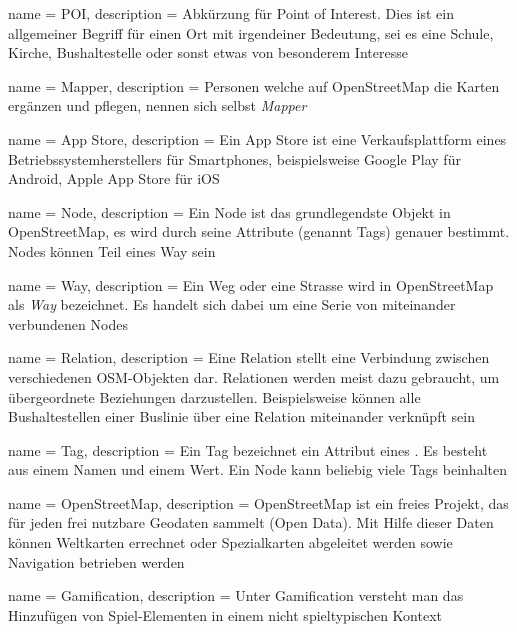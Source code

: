  {
	name = POI,
	description = {Abkürzung für Point of Interest. Dies ist ein allgemeiner Begriff für einen Ort mit irgendeiner Bedeutung, sei es eine Schule, Kirche, Bushaltestelle oder sonst etwas von besonderem Interesse\cite{ba-kort-2012}}
}

 {
	name = Mapper,
	description = {Personen welche auf OpenStreetMap die Karten ergänzen und pflegen, nennen sich selbst \emph{Mapper}\cite{ba-kort-2012}}
}

 {
	name = App Store,
	description = {Ein App Store ist eine Verkaufsplattform eines Betriebssystemherstellers für Smartphones, beispielsweise Google Play für Android, Apple App Store für iOS\cite{ba-kort-2012}}
}

 {
	name = Node,
	description = {Ein Node ist das grundlegendste Objekt in OpenStreetMap, es wird durch seine Attribute (genannt \glspl{Tag}) genauer bestimmt. Nodes können Teil eines \gls{Way} sein\cite{ba-kort-2012}}
}

 {
	name = Way,
	description = {Ein Weg oder eine Strasse wird in OpenStreetMap als \emph{Way} bezeichnet. Es handelt sich dabei um eine Serie von miteinander verbundenen Nodes\cite{ba-kort-2012}}
}

 {
	name = Relation,
	description = {Eine Relation stellt eine Verbindung zwischen verschiedenen OSM-Objekten dar. Relationen werden meist dazu gebraucht, um übergeordnete Beziehungen darzustellen. Beispielsweise können alle Bushaltestellen einer Buslinie über eine Relation miteinander verknüpft sein\cite{ba-kort-2012}}
}

 {
	name = Tag,
	description = {Ein Tag bezeichnet ein Attribut eines . Es besteht aus einem Namen und einem Wert. Ein \gls{Node} kann beliebig viele Tags beinhalten\cite{ba-kort-2012}}
}

 {
	name = OpenStreetMap,
	description = {OpenStreetMap ist ein freies Projekt, das für jeden frei nutzbare Geodaten sammelt (Open Data). Mit Hilfe dieser Daten können Weltkarten errechnet oder Spezialkarten abgeleitet werden sowie Navigation betrieben werden\cite{ba-kort-2012}}
}

 {
	name = Gamification,
	description = {Unter Gamification versteht man das Hinzufügen von Spiel-Elementen in einem nicht spieltypischen Kontext\cite{for-the-win.}}
}

